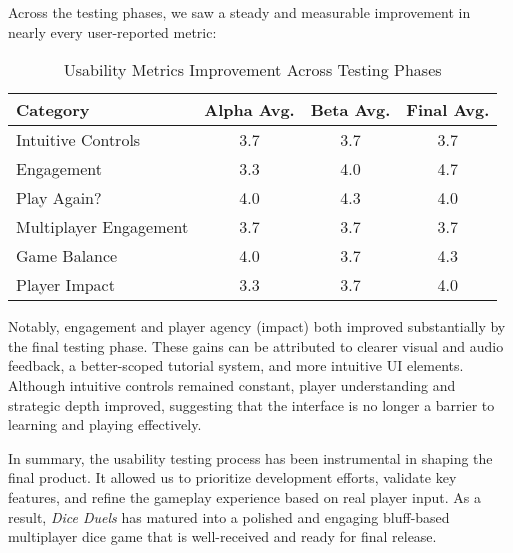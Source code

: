 \documentclass{article}
\begin{document}
Across the testing phases, we saw a steady and measurable improvement in nearly every user-reported metric:

\begin{table}[H]
\centering
\caption{Usability Metrics Improvement Across Testing Phases}
\begin{tabular}{|l|c|c|c|}
\hline
\textbf{Category} & \textbf{Alpha Avg.} & \textbf{Beta Avg.} & \textbf{Final Avg.} \\
\hline
Intuitive Controls & 3.7 & 3.7 & 3.7 \\
Engagement & 3.3 & 4.0 & 4.7 \\
Play Again? & 4.0 & 4.3 & 4.0 \\
Multiplayer Engagement & 3.7 & 3.7 & 3.7 \\
Game Balance & 4.0 & 3.7 & 4.3 \\
Player Impact & 3.3 & 3.7 & 4.0 \\
\hline
\end{tabular}
\end{table}

Notably, engagement and player agency (impact) both improved substantially by the final testing phase. These gains can be attributed to clearer visual and audio feedback, a better-scoped tutorial system, and more intuitive UI elements. Although intuitive controls remained constant, player understanding and strategic depth improved, suggesting that the interface is no longer a barrier to learning and playing effectively.

In summary, the usability testing process has been instrumental in shaping the final product. It allowed us to prioritize development efforts, validate key features, and refine the gameplay experience based on real player input. As a result, \textit{Dice Duels} has matured into a polished and engaging bluff-based multiplayer dice game that is well-received and ready for final release.
\end{document}
